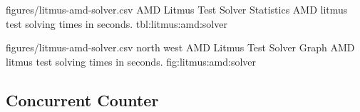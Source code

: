 

\SolverStatsTable
  {figures/litmus-amd-solver.csv}
  {\textnumero}
  {\AMDRowHeader}
  {AMD Litmus Test Solver Statistics}
  {AMD litmus test solving times in seconds.}
  {tbl:litmus:amd:solver}

\SolverStatsGraph
  {figures/litmus-amd-solver.csv}
  {north west}
  {AMD Litmus Test Solver Graph}
  {AMD litmus test solving times in seconds.}
  {fig:litmus:amd:solver}

\newpage

\subsection*{Concurrent Counter}

\newcommand{\tikzmark}[1]{\tikz[overlay,remember picture] \node (#1) {};}
\newcommand*{\AddNote}[3]{%
  \begin{tikzpicture}[overlay, remember picture]
    \draw [decoration={brace,amplitude=0.5em},decorate,thick,red!60!black]
      ($(#1)!([yshift=1.5ex]#1)!($(#1)-(0,1)$)$) --
      ($(#1)!(#2)!($(#1)-(0,1)$)$)
      node [align=center, text width=1.0cm, pos=0.5, anchor=west] {\textsf{#3}};
  \end{tikzpicture}
}%


